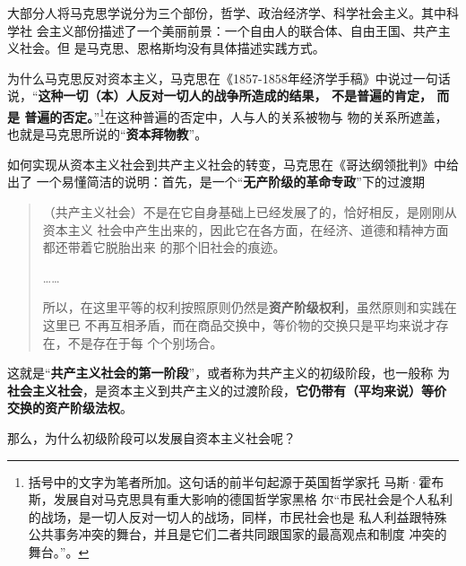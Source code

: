 大部分人将马克思学说分为三个部份，哲学、政治经济学、科学社会主义。其中科学社
会主义部份描述了一个美丽前景：一个自由人的联合体、自由王国、共产主义社会。但
是马克思、恩格斯均没有具体描述实践方式。

为什么马克思反对资本主义，马克思在《1857-1858年经济学手稿》中说过一句话
说，“\textbf{这种一切（本）人反对一切人的战争所造成的结果， 不是普遍的肯定， 而是
  普遍的否定。}”\footnote{括号中的文字为笔者所加。这句话的前半句起源于英国哲学家托
  马斯·霍布斯\cite[531]{karlvol46a}，发展自对马克思具有重大影响的德国哲学家黑格
  尔“市民社会是个人私利的战场，是一切人反对一切人的战场，同样，市民社会也是
  私人利益跟特殊公共事务冲突的舞台，并且是它们二者共同跟国家的最高观点和制度
  冲突的舞台。”\cite[309]{hegelyuanli}。}在这种普遍的否定中，人与人的关系被物与
物的关系所遮盖，也就是马克思所说的“\textbf{资本拜物教}”。

如何实现从资本主义社会到共产主义社会的转变，马克思在《哥达纲领批判》中给出了
一个易懂简洁的说明：首先，是一个“\textbf{无产阶级的革命专政}”下的过渡期
\begin{quotation}
  （共产主义社会）不是在它自身基础上已经发展了的，恰好相反，是刚刚从资本主义
  社会中产生出来的，因此它在各方面，在经济、道德和精神方面都还带着它脱胎出来
  的那个旧社会的痕迹。

  ……

  所以，在这里平等的权利按照原则仍然是\textbf{资产阶级权利}，虽然原则和实践在这里已
  不再互相矛盾，而在商品交换中，等价物的交换只是平均来说才存在，不是存在于每
  个个别场合。\cite[434]{maenwen3}
\end{quotation}

这就是“\textbf{共产主义社会的第一阶段}”，或者称为共产主义的初级阶段，也一般称
为\textbf{社会主义社会}，是资本主义到共产主义的过渡阶段，\textbf{它仍带有（平均来说）等价
  交换的资产阶级法权}。

那么，为什么初级阶段可以发展自资本主义社会呢？



